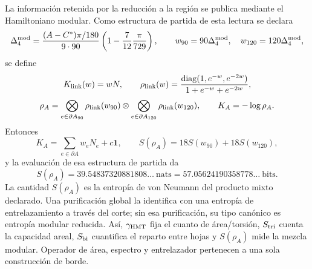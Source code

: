 La información retenida por la reducción a la región se publica mediante el
Hamiltoniano modular. Como estructura de partida de esta lectura se declara
\[
 \Delta_4^{\rm mod}
 =\frac{(A-C^*)\pi/180}{9\cdot90}
 \left(1-\frac7{12}\frac\pi{729}\right),
 \qquad w_{90}=90\Delta_4^{\rm mod},\quad
 w_{120}=120\Delta_4^{\rm mod},
\]
se define
\[
 K_{\rm link}(w)=wN,
 \qquad
 \rho_{\rm link}(w)=
 \frac{\operatorname{diag}(1,e^{-w},e^{-2w})}
 {1+e^{-w}+e^{-2w}},
\]
\begin{equation}
 \rho_A=
 \bigotimes_{e\in\partial A_{90}}\rho_{\rm link}(w_{90})
 \otimes
 \bigotimes_{e\in\partial A_{120}}\rho_{\rm link}(w_{120}),
 \qquad K_A=-\log\rho_A.
 \label{p12-83-c14-s2:eq:estado-hamiltoniano-modular-barbero-rev11}
\end{equation}
Entonces
\[
 K_A=\sum_{e\in\partial A}w_eN_e+c\mathbf1,
 \qquad
 S(\rho_A)=18S(w_{90})+18S(w_{120}),
\]
y la evaluación de esa estructura de partida da
\[
 S(\rho_A)=39.54837320881808\ldots\ \text{nats}
 =57.05624190358778\ldots\ \text{bits}.
\]
La cantidad \(S(\rho_A)\) es la entropía de von Neumann del producto mixto
declarado. Una purificación global la identifica con una entropía de
entrelazamiento a través del corte; sin esa purificación, su tipo canónico es
entropía modular reducida. Así, \(\gamma_{\rm HMT}\) fija el cuanto de
área/torsión, \(S_{\rm tri}\) cuenta la capacidad areal, \(S_{\rm bi}\)
cuantifica el reparto entre hojas y \(S(\rho_A)\) mide la mezcla modular.
Operador de área, espectro y entrelazador pertenecen a una sola construcción
de borde.

